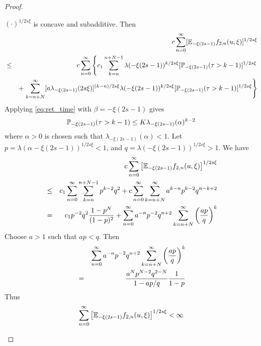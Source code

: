 \documentclass{article}
\begin{document}
\begin{proof}
\begin{enumerate}[(i)]
\begin{itemize}
      $(\cdot)^{1/2s\xi}$ is concave and subadditive. Then
      \begin{eqnarray*}
        && c \sum_{n=0}^\infty [\E_{-\xi(2s - 1)} f_{2,n}(u,\xi)]^{1/2s\xi} \\
        &\leq& c \sum_{n=0}^\infty \left\{
          c_1 \sum_{k=n}^{n+N-1} \lambda(-\xi(2s - 1))^{k/2s\xi} [\P_{-\xi(2s -
            1)}(\tau > k-1)]^{1/2s\xi} \right.\\
        && + \left.\sum_{k=n+N}^\infty [a \lambda_{-\xi(2s - 1)}(2s\xi)]^{(k-n)/2s\xi}
          \lambda(-\xi(2s - 1))^{k/2s\xi} [\P_{-\xi(2s - 1)}(\tau > k-1)]^{1/2s\xi}
        \right\}
      \end{eqnarray*}
      Applying \eqref{eq:ret_time} with $\beta = -\xi(2s - 1)$ gives
      \[
      \P_{-\xi(2s - 1)}(\tau > k-1) \leq K \lambda_{-\xi(2s - 1)}(\alpha)^{k-2}
      \]
      where $\alpha > 0$ is chosen such that $\lambda_{-\xi(2s -
        1)}(\alpha) < 1$.
      Let $p = \lambda(\alpha - \xi(2s - 1))^{1/2s\xi} < 1$, and $q =
      \lambda(-\xi(2s - 1))^{1/2s\xi} > 1$. We have
      \begin{eqnarray*}
        && c \sum_{n=0}^\infty \left[
          \E_{-\xi(2s - 1)} f_{2,n}(u,\xi)
        \right]^{1/2s\xi} \\
        &\leq& c_1 \sum_{n=0}^\infty \sum_{k=n}^{n+N-1} p^{k-2} q^{2} +
        c \sum_{n=0}^{\infty} \sum_{k=n+N}^\infty a^{k-n} p^{k-2}
        q^{n-k+2} \\
        &=& c_1 p^{-2} q^2 {1 - p^N \over (1-p)^2 }
        + \sum_{n=0}^{\infty} a^{-n} p^{-2} q^{n+2} \sum_{k=n+N}^{\infty}
        \left({ap \over q}\right)^k
      \end{eqnarray*}
      Choose $a > 1$ such that $ap < q$. Then
      \begin{eqnarray*}
        && \sum_{n=0}^{\infty} a^{-n} p^{-2} q^{n+2} \sum_{k=n+N}^{\infty}
        \left({ap \over q}\right)^k \\
        &=& \frac{
          a^N p^{N-2} q^{2-N}
        }{
          1 - ap/q
        } {1 \over 1 - p}
      \end{eqnarray*}
      Thus
      \[
      \sum_{n=0}^\infty \left[
        \E_{-\xi(2s - 1)} f_{2,n}(u,\xi)
      \right]^{1/2s\xi} < \infty  
      \]


\end{itemize}
\end{enumerate}
\end{proof}
\end{document}
